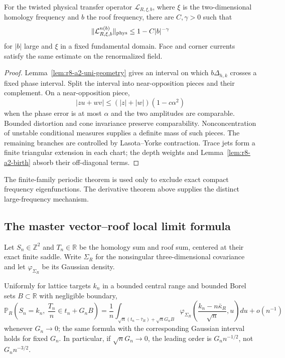 \begin{theorem}
\label{thm:r8-a2-dolgopyat}
For the twisted physical transfer operator
$\mathcal L_{R,\xi,b}$, where $\xi$ is the two-dimensional homology frequency
and $b$ the roof frequency, there are $C,\gamma>0$ such that
\[
 \|\mathcal L_{R,\xi,b}^{n(b)}\|_{\rm phys}
 \le 1-C|b|^{-\gamma}
\]
for $|b|$ large and $\xi$ in a fixed fundamental domain.  Face and corner
currents satisfy the same estimate on the renormalized field.
\end{theorem}

\begin{proof}
Lemma~\ref{lem:r8-a2-uni-geometry} gives an interval on which
$b\Delta_{h,k}$ crosses a fixed phase interval.  Split the interval into
near-opposition pieces and their complement.  On a near-opposition piece,
\[
 |zu+wv|\le(|z|+|w|)(1-c\alpha^2)
\]
when the phase error is at most $\alpha$ and the two amplitudes are comparable.
Bounded distortion and cone invariance preserve comparability.  Nonconcentration
of unstable conditional measures supplies a definite mass of such pieces.
The remaining branches are controlled by Lasota--Yorke contraction.  Trace
jets form a finite triangular extension in each chart; the depth weights and
Lemma~\ref{lem:r8-a2-birth} absorb their off-diagonal terms.
\end{proof}

The finite-family periodic theorem is used only to exclude exact compact
frequency eigenfunctions.  The derivative theorem above supplies the distinct
large-frequency mechanism.

\subsection{The master vector--roof local limit formula}

Let $S_n\in\mathbb Z^2$ and $T_n\in\mathbb R$ be the homology sum and roof sum,
centered at their exact finite saddle.  Write $\Sigma_R$ for the nonsingular
three-dimensional covariance and let $\varphi_{\Sigma_R}$ be its Gaussian
density.

\begin{theorem}
\label{thm:r8-a2-llt}
Uniformly for lattice targets $k_n$ in a bounded central range and bounded
Borel sets $B\subset\mathbb R$ with negligible boundary,
\[
 \mathbb P_R\!\left(
 S_n=k_n,\ \frac{T_n}{n}\in t_n+G_nB
 \right)
 =\frac{1}{n}\int_{\sqrt n(t_n-\bar\tau_R)+\sqrt n G_nB}
 \varphi_{\Sigma_R}\!\left(
 \frac{k_n-n\bar\kappa_R}{\sqrt n},u
 \right)du+o(n^{-1})
\]
whenever $G_n\to0$; the same formula with the corresponding Gaussian interval
holds for fixed $G_n$.  In particular, if $\sqrt nG_n\to0$, the leading order
is $G_n n^{-1/2}$, not $G_n n^{-3/2}$.
\end{theorem}


